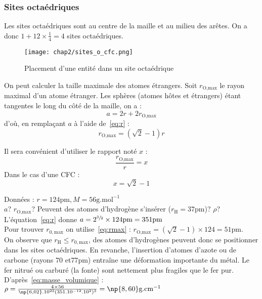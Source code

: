 \subsubsection{Sites octaédriques}
Les sites octaédriques sont au centre de la maille et au milieu
des arêtes. On a donc $1 + 12 \times \frac{1}{4} = 4$ sites octaédriques.
\begin{figure}
    \centering
    \texttt{[image: chap2/sites\_o\_cfc.png]}
    \caption{Placement d'une entité dans un site octaédrique}\label{fig:site_o_cfc}
\end{figure}
On peut calculer la taille maximale des atomes étrangers.
Soit $r_{\text{O,max}}$ le rayon maximal d'un atome étranger.
Les sphères (atomes h\^otes et étrangers) étant tangentes le
long du c\^oté de la maille, on a :
\begin{equation}
    a = 2r + 2r_{\text{O,max}}
\end{equation}
d'où, en remplaçant $a$ à l'aide de~\ref{eq:r} :
\begin{equation}
    \boxed{r_{\text{O,max}} = (\sqrt{2} - 1)r} \label{eq:rmax}
\end{equation}
\begin{rem}
    Il sera convénient d'utiliser le rapport noté $x$ :
    \begin{equation*}
        \frac{r_{\text{O,max}}}{r} = x
    \end{equation*}
    Dans le cas d'une CFC :
    \begin{equation*}
        x = \sqrt{2} - 1
    \end{equation*}
\end{rem}

\begin{ex}
    Données : $r = 124\text{pm}, M = 56\text{g.mol}^{-1}$\\
    $a$? $r_{\text{O,max}}$? Peuvent des atomes d'hydrogène s'insérer
    ($r_{\text{H}} = 37$pm)? $\rho$?\\
    L'équation~\ref{eq:r} donne
    $a=2^{\sfrac{3}{2}} \times 124\text{pm} = 351\text{pm}$\\
    Pour trouver $r_{0,\text{max}}$ on utilise~\ref{eq:rmax} :
    $r_{\text{O,max}} = (\sqrt{2} - 1)\times 124 = 51\text{pm}$.\\
    On observe que $r_{\text{H}} \leq r_{0,\text{max}}$, des atomes
    d'hydrogènes peuvent donc se positionner dans les sites
    octaédriques. En revanche, l'insertion d'atomes d'azote ou de
    carbone (rayons $70$ et$77$pm) entraîne une déformation importante
    du métal. Le fer nitrué ou carburé (la fonte) sont nettement
    plus fragiles que le fer pur.\\
    D'après~\ref{eq:masse_volumique} :
    $\rho = \frac{4 \times 56}{\np{6,02}.10^{23}(351.10^{-12}.10^2)^3} = \np{8,60}\text{g.cm}^{-1}$
\end{ex}

